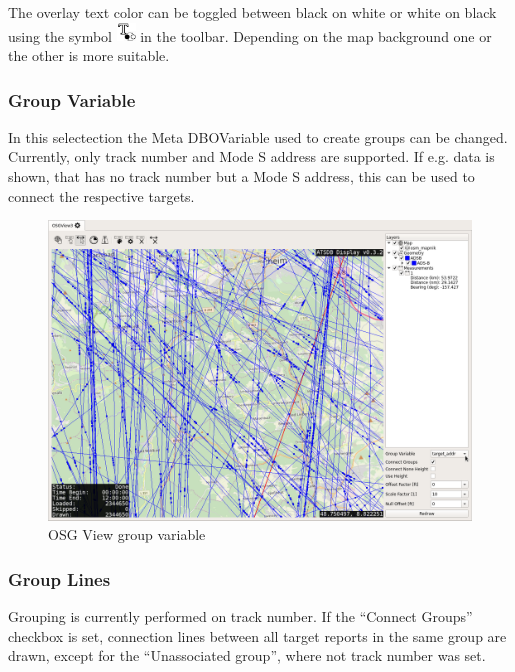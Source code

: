 {The overlay text color can be toggled between black on white or white on black using the symbol \includegraphics[width=0.5cm]{../../data/icons/text_invert.png} in the toolbar. Depending on the map background one or the other is more suitable.

\subsubsection{Group Variable}

In this selectection the Meta DBOVariable used to create groups can be changed. Currently, only track number and Mode S address are supported. If e.g. data is shown, that has no track number but a Mode S address, this can be used to connect the respective targets.

\begin{figure}[H]
    \hspace*{-2cm}
    \includegraphics[width=18cm,frame]{../screenshots/osgview_group_variable.png}
  \caption{OSG View group variable}
\end{figure}


\subsubsection{Group Lines}

Grouping is currently performed on track number. If the ``Connect Groups'' checkbox is set, connection lines between all target reports in the same group are drawn, except for the ``Unassociated group'', where not track number was set.

}
